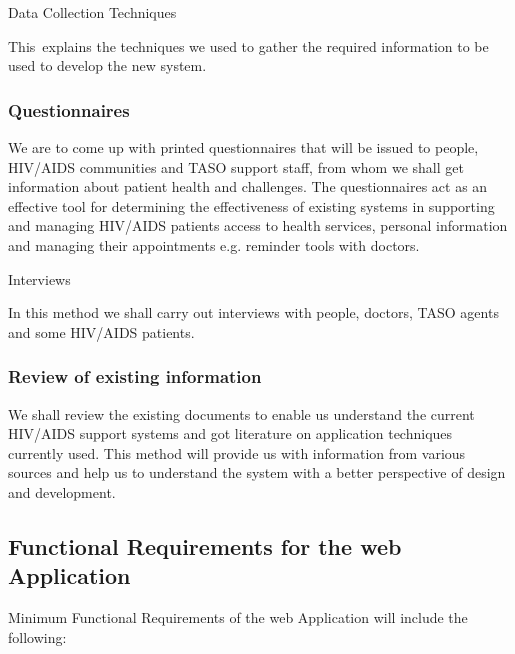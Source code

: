 \documentclass[12pt]{article}
\begin{document}
Data Collection Techniques \par

This\ explains the techniques we used to gather the required information to be used to develop the new system.  \par

\subsubsection*{Questionnaires}
We are to come up with printed questionnaires that will be issued to people, HIV/AIDS communities and TASO support staff, from whom we shall get information about patient health and challenges. The questionnaires act as an effective tool for determining the effectiveness of existing systems in supporting and managing HIV/AIDS patients access to health services, personal information and managing their appointments e.g. reminder tools with doctors. \par

Interviews\par

In this method we shall carry out interviews with people, doctors, TASO agents and some HIV/AIDS patients. \par

\subsubsection*{Review of existing information}
We shall review the existing documents to enable us understand the current HIV/AIDS support systems and got literature on application techniques currently used. This method will provide us with information from various sources and help us to understand the system with a better perspective of design and development.\par

\subsection{Functional Requirements for the web Application}
Minimum Functional Requirements of the web Application will include the following:\par
\end{document}
